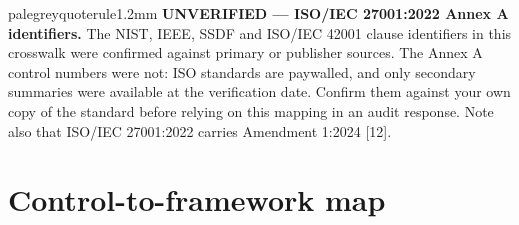 \documentclass[11pt,a4paper,twoside,openany]{book}
\begin{document}
\begin{calloutbox}{palegrey}{quoterule}{1.2mm}
\textbf{UNVERIFIED — ISO/IEC 27001:2022 Annex A identifiers.} The NIST, IEEE, SSDF and ISO/IEC 42001 clause identifiers in this crosswalk were confirmed against primary or publisher sources. The Annex A control numbers were not: ISO standards are paywalled, and only secondary summaries were available at the verification date. Confirm them against your own copy of the standard before relying on this mapping in an audit response. Note also that ISO/IEC 27001:2022 carries Amendment 1:2024 [12].
\end{calloutbox}

\FloatBarrier
\section*{Control-to-framework map}
\end{document}
